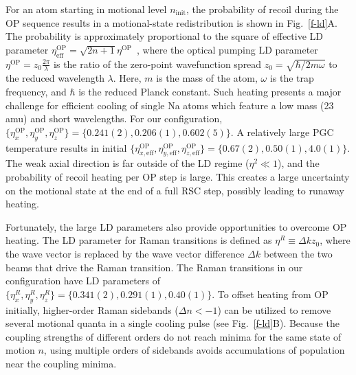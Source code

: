 \documentclass[aps,prl,twocolumn,groupedaddress]{revtex4-1}
\begin{document}
For an atom starting in motional level $n_{\textrm{init}}$, the probability of recoil during the OP sequence results in
a motional-state redistribution  is shown in Fig.~\ref{f-ld}A.
The  probability is approximately proportional to the square of effective LD parameter
$\eta^{\textrm{OP}}_{\textrm{eff}}=\sqrt{2n+1}\eta^{\textrm{OP}}$~\cite{Kaufman2012},
where the optical pumping LD parameter $\eta^{\textrm{OP}} = z_0\frac{2\pi}{\lambda}$ is the ratio of the zero-point wavefunction spread $z_0 = \sqrt{\hbar/2m\omega}$ to the reduced wavelength $\lambda$.
Here, $m$ is the mass of the atom, $\omega$ is the trap frequency,
and $\hbar$ is the reduced Planck constant.
Such heating presents a major challenge for efficient cooling of single Na atoms
which feature a low mass (23 amu) and short wavelengths.
For our configuration,
$\{\eta^{\textrm{OP}}_x,\eta^{\textrm{OP}}_y,\eta^{\textrm{OP}}_z\} = \{0.241(2), 0.206(1), 0.602(5)\}$.
A relatively large PGC temperature results in initial $\{\eta^{\textrm{OP}}_{x,\textrm{eff}},\eta^{\textrm{OP}}_{y,\textrm{eff}},\eta^{\textrm{OP}}_{z,\textrm{eff}}\} = \{0.67(2), 0.50(1), 4.0(1)\}$.
The weak axial direction %
is far outside of the LD regime ($\eta^2\ll 1$), and the probability of recoil heating per OP step is large. %
This creates a large uncertainty on the motional state at the end of a full RSC step, possibly leading to runaway heating.

Fortunately, the large LD parameters also provide opportunities to overcome OP heating.
The LD parameter for Raman transitions is defined as $\eta^R\equiv\Delta k z_0$,
where the wave vector is replaced by the wave vector difference $\Delta k$
between the two beams that drive the Raman transition.
The Raman transitions in our configuration have LD parameters of
$\{\eta^R_x,\eta^R_y,\eta^R_z\} = \{0.341(2), 0.291(1), 0.40(1)\}$.
To offset heating from OP initially, higher-order Raman  sidebands ($\Delta n <-1$)  can be utilized
to remove several motional quanta in a single cooling pulse (see Fig.~\ref{f-ld}B).
Because the coupling strengths of different orders do not reach minima for the same state of motion $n$,
using multiple orders of sidebands avoids accumulations of population
near the coupling minima.
\end{document}
